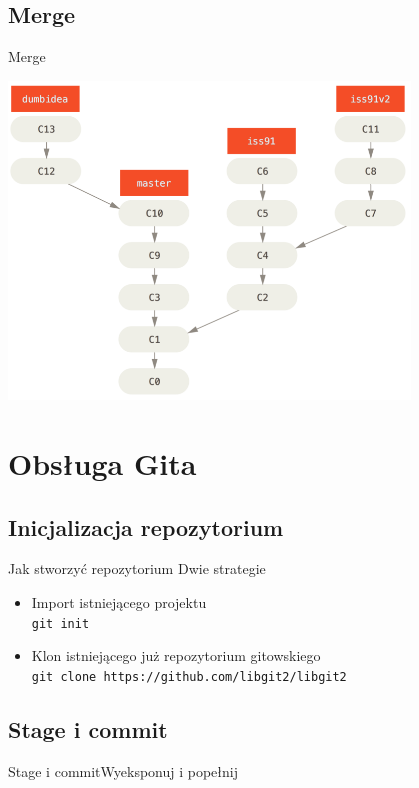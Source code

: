 \documentclass{beamer}
\begin{document}
\subsection{Merge}
\begin{frame}{Merge}
   \begin{center}
   \includegraphics[width=0.8\textwidth]{./obrazki/fig-3_20.png}
 \end{center}
\end{frame}

\section{Obsługa Gita}

\subsection{Inicjalizacja repozytorium}
\begin{frame}{Jak stworzyć repozytorium}
 Dwie strategie
 \begin{itemize}
  \item Import istniejącego projektu \\
  \texttt{git init}
  \item Klon istniejącego już repozytorium gitowskiego \\
  \texttt{git clone https://github.com/libgit2/libgit2}
 \end{itemize}
\end{frame}

\subsection{Stage i commit}
\begin{frame}{Stage i commit}{Wyeksponuj i popełnij}
 
\end{frame}
\end{document}
